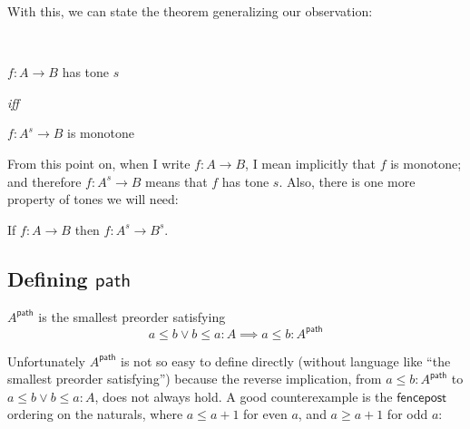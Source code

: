 \documentclass{rntz}
\newcommand{\ms}[1]{\ensuremath{\mathsf{#1}}}
\renewcommand{\path}{\ms{path}}
\begin{document}
With this, we can state the theorem generalizing our observation:
\begin{theorem}\label{thm:tones-transform-orders}
  ~
  \begin{center}
    $f : A \to B$ has tone $s$

    \nopagebreak \emph{iff} \nopagebreak

    $f : A^s \to B$ is monotone
  \end{center}
\end{theorem}

From this point on, when I write $f : A \to B$, I mean implicitly that $f$ is
monotone; and therefore $f : A^s \to B$ means that $f$ has tone $s$.
%
Also, there is one more property of tones we will need:

\begin{theorem}\label{thm:tone-functoriality}
  If $f : A \to B$ then $f : A^s \to B^s$.
\end{theorem}

\subsection{Defining \ms{path}} \label{sec:defining-path}

$A^\path$ is the smallest preorder satisfying
\[ a \le b \vee b \le a : A \implies a \le b : A^\path \]

Unfortunately $A^\path$ is not so easy to define directly (without
language like ``the smallest preorder satisfying'')
%
because the reverse implication, from $a \le b : A^\path$ to $a \le b \vee b \le
a : A$, does not always hold. A good counterexample is the \ms{fencepost}
ordering on the naturals, where $a \le a+1$ for even $a$, and $a \ge a+1$ for
odd $a$:

\begin{center}
\end{center}
\end{document}

